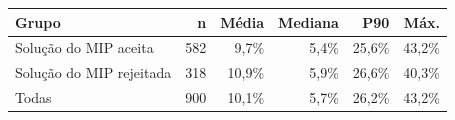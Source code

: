 \begin{tabular}{lrrrrr}
\toprule
Grupo & n & Média & Mediana & P90 & Máx. \\
\midrule
Solução do MIP aceita & 582 & 9,7\% & 5,4\% & 25,6\% & 43,2\% \\
Solução do MIP rejeitada & 318 & 10,9\% & 5,9\% & 26,6\% & 40,3\% \\
Todas & 900 & 10,1\% & 5,7\% & 26,2\% & 43,2\% \\
\bottomrule
\end{tabular}
